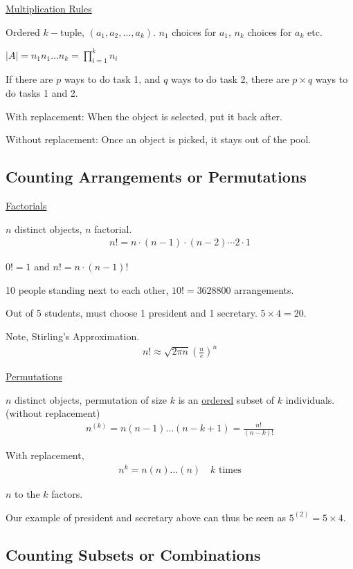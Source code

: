 \documentclass{article}
\begin{document}
\underline{Multiplication Rules}

Ordered $k-$tuple, $(a_1, a_2, \ldots, a_k)$. $n_1$ choices for $a_1$, $n_k$ choices for $a_k$ etc.

$|A| = n_1n_1 \ldots n_k = \prod_{i=1}^kn_i$

If there are $p$ ways to do task 1, and $q$ ways to do task 2, there are $p \times q$ ways to do tasks 1 and 2. 

With replacement: When the object is selected, put it back after. 

Without replacement: Once an object is picked, it stays out of the pool.


\subsection{Counting Arrangements or Permutations}

\underline{Factorials}

$n$ distinct objects, $n$ factorial.
\begin{align*}
    n! = n \cdot (n-1) \cdot (n - 2) \cdots 2 \cdot 1
\end{align*}

$0! = 1$ and $n! = n \cdot (n-1)!$

10 people standing next to each other, $10! = 3628800$ arrangements. 

Out of 5 students, must choose 1 president and 1 secretary. $5 \times 4 = 20$.

Note, Stirling's Approximation. 
\begin{align*}
    n! \approx \sqrt{2\pi n}\left(\frac{n}{e}\right)^n
\end{align*}

\underline{Permutations}

$n$ distinct objects, permutation of size $k$ is an \underline{ordered} subset of $k$ individuals. (without replacement)
\begin{align*}
    n^{(k)} = n(n-1) \ldots (n-k+1) = \frac{n!}{(n-k)!}
\end{align*}

With replacement, 
\begin{align*}
    n^k = n(n)\ldots(n) \quad k \text{ times}
\end{align*}

$n$ to the $k$ factors.

Our example of president and secretary above can thus be seen as $5^{(2)} = 5 \times 4$.

\subsection{Counting Subsets or Combinations}
\end{document}
